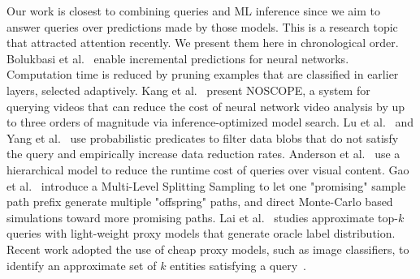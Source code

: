 Our work is closest to combining queries and ML inference since we aim to answer queries over predictions made by those models. This is a research topic that attracted attention recently. We present them here in chronological order. 
Bolukbasi et al.~\cite{DBLP:conf/icml/BolukbasiWDS17} enable  incremental predictions for neural networks.  
 Computation time is reduced by pruning examples that are classified in earlier layers, selected adaptively. 
Kang et al.~\cite{DBLP:journals/pvldb/KangEABZ17} present NOSCOPE, a system for querying videos that can reduce the cost of neural network video analysis by up to three orders of magnitude via inference-optimized model search.
Lu et al.~\cite{DBLP:conf/sigmod/LuCKC18} and Yang et al.~\cite{10.14778/3547305.3547310} use probabilistic predicates to filter data blobs that do not satisfy the query and empirically increase data reduction rates. 
Anderson et al.~\cite{DBLP:conf/icde/AndersonCRW19} use a hierarchical model to reduce the runtime cost of queries over visual content. 
Gao et al.~\cite{DBLP:conf/sigmod/GaoXAY21} introduce a Multi-Level Splitting Sampling to let one "promising" sample path prefix generate multiple "offspring" paths, and direct Monte-Carlo based simulations toward more promising paths. 
Lai et al.~\cite{10.1145/3448016.3452786} studies approximate top-$k$ queries with light-weight proxy models that generate oracle label distribution.
Recent work adopted the use of cheap proxy models, such as image classifiers, to identify  an  approximate  set  of $k$ entities satisfying a query~\cite{DBLP:journals/pvldb/DingAL22,DBLP:journals/pvldb/KangGBHZ20}. 
